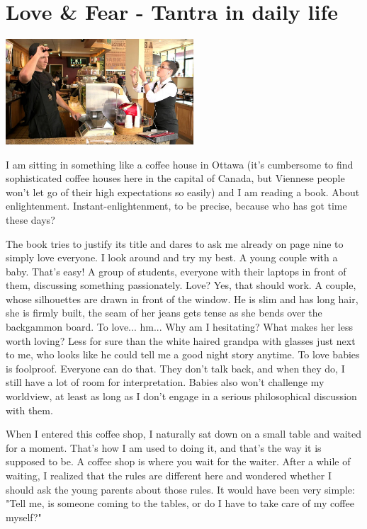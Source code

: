 \section{Love \& Fear - Tantra in daily life}

\begin{center}
\includegraphics[width=7cm]{images/21_fear.png}
\end{center}

I am sitting in something like a coffee house in Ottawa (it's cumbersome to find sophisticated coffee houses here in the capital of Canada, but Viennese people won't let go of their high expectations so easily) and I am reading a book. About enlightenment. Instant-enlightenment, to be precise, because who has got time these days?

The book tries to justify its title and dares to ask me already on page nine to simply love everyone. I look around and try my best. A young couple with a baby. That's easy! A group of students, everyone with their laptops in front of them, discussing something passionately. Love? Yes, that should work. A couple, whose silhouettes are drawn in front of the window. He is slim and has long hair, she is firmly built, the seam of her jeans gets tense as she bends over the backgammon board. To love... hm... Why am I hesitating? What makes her less worth loving? Less for sure than the white haired grandpa with glasses just next to me, who looks like he could tell me a good night story anytime. To love babies is foolproof. Everyone can do that. They don't talk back, and when they do, I still have a lot of room for interpretation. Babies also won't challenge my worldview, at least as long as I don't engage in a serious philosophical discussion with them.

When I entered this coffee shop, I naturally sat down on a small table and waited for a moment. That's how I am used to doing it, and that's the way it is supposed to be. A coffee shop is where you wait for the waiter. After a while of waiting, I realized that the rules are different here and wondered whether I should ask the young parents about those rules. It would have been very simple: "Tell me, is someone coming to the tables, or do I have to take care of my coffee myself?"

